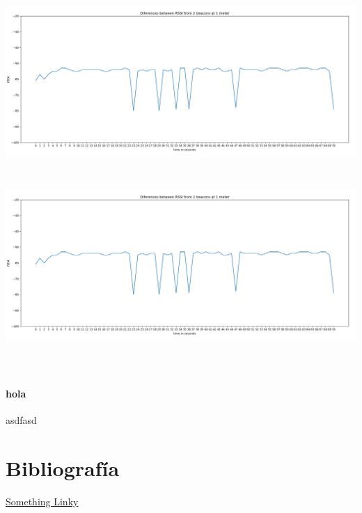 \documentclass[a4paper ,12pt, onecolumn]{article}
\begin{document}
\includegraphics[scale=0.3]{5min_beacon_rssi}
\includegraphics[width=15cm, height=8cm]{5min_beacon_rssi}
\paragraph{hola}
asdfasd



\section{Bibliografía}
\href{https://campus.masterd.es/campusvirtual/index.htm}{Something Linky} 
\end{document}
